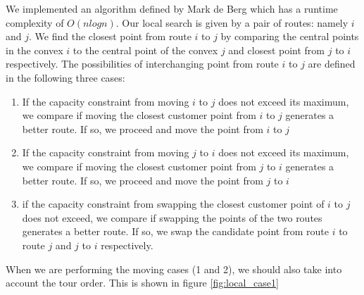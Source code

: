 \documentclass[12pt]{article}
\begin{document}
We implemented an algorithm defined by Mark de Berg \cite{Berg97} which has a runtime complexity of $O(nlogn)$. Our local search is given by a pair of routes: namely \(i\) and \(j\). We find the closest point from route \(i\) to \(j\) by comparing the central points in the convex \(i\) to the central point of the convex \(j\) and closest point from \(j\) to \(i\) respectively. 
The possibilities of interchanging point from route \(i\) to \(j\) are defined in the following three cases:
\begin{enumerate}

	\item If the capacity constraint from moving \(i\) to \(j\) does not exceed its maximum, we compare if moving the closest customer point from \(i\) to \(j\) generates a better route. If so, we proceed and move the point from \(i\) to \(j\)

	\item If the capacity constraint from moving \(j\) to \(i\) does not exceed its maximum, we compare if moving the closest customer point from \(j\) to \(i\) generates a better route. If so, we proceed and move the point from \(j\) to \(i\)

	\item if the capacity constraint from swapping the closest customer point of \(i\) to \(j\) does not exceed, we compare if swapping the points of the two routes generates a better route. If so, we swap the candidate point from route \(i\) to route \(j\) and \(j\) to \(i\) respectively.
\end{enumerate}

When we are performing  the moving cases (1 and 2), we should also take into account the tour order. This is shown in figure \ref{fig:local_case1}
\newline

\begin{figure}[!ht]
	\centering
	\hfill
\end{figure}
\end{document}
